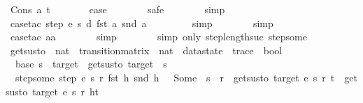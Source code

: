 \begin{isabellebody}
\ {\isacharparenleft}Cons\ a\ t{\isacharparenright}\isanewline
\ \ \ \ \isamarkupfalse%
\ \isamarkupfalse%
\ {\isacharquery}case\isanewline
\ \ \ \ \ \ \isamarkupfalse%
\ safe\isanewline
\ \ \ \ \ \ \isamarkupfalse%
\ simp\isanewline
\ \ \ \ \ \ \isamarkupfalse%
\ {\isacharparenleft}case{\isacharunderscore}tac\ {\isachardoublequoteopen}step\ e\ s\ d\ {\isacharparenleft}fst\ a{\isacharparenright}\ {\isacharparenleft}snd\ a{\isacharparenright}{\isachardoublequoteclose}{\isacharparenright}\isanewline
\ \ \ \ \ \ \ \isamarkupfalse%
\ simp\isanewline
\ \ \ \ \ \ \isamarkupfalse%
\ simp\isanewline
\ \ \ \ \ \ \isamarkupfalse%
\ {\isacharparenleft}case{\isacharunderscore}tac\ aa{\isacharparenright}\isanewline
\ \ \ \ \ \ \isamarkupfalse%
\ simp\isanewline
\ \ \ \ \ \ \isamarkupfalse%
\ {\isacharparenleft}simp\ only{\isacharcolon}\ step{\isacharunderscore}length{\isacharunderscore}suc\ step{\isacharunderscore}some{\isacharparenright}\isanewline
\ \ \isamarkupfalse%
%
\endisatagproof
{\isafoldproof}%
%
\isadelimproof
\isanewline
%
\endisadelimproof
\isanewline
{}\isamarkupfalse%
\ gets{\isacharunderscore}us{\isacharunderscore}to\ {\isacharcolon}{\isacharcolon}\ {\isachardoublequoteopen}nat\ {\isasymRightarrow}\ transition{\isacharunderscore}matrix\ {\isasymRightarrow}\ nat\ {\isasymRightarrow}\ datastate\ {\isasymRightarrow}\ trace\ {\isasymRightarrow}\ bool{\isachardoublequoteclose}\ \isanewline
\ \ base{\isacharcolon}\ {\isachardoublequoteopen}s\ {\isacharequal}\ target\ {\isasymLongrightarrow}\ gets{\isacharunderscore}us{\isacharunderscore}to\ target\ {\isacharunderscore}\ s\ {\isacharunderscore}\ {\isacharbrackleft}{\isacharbrackright}{\isachardoublequoteclose}\ {\isacharbar}\isanewline
\ \ step{\isacharunderscore}some{\isacharcolon}\ {\isachardoublequoteopen}step\ e\ s\ r\ {\isacharparenleft}fst\ h{\isacharparenright}\ {\isacharparenleft}snd\ h{\isacharparenright}\ {\isacharequal}\ \ Some\ {\isacharparenleft}{\isacharunderscore}{\isacharcomma}\ s{\isacharprime}{\isacharcomma}\ {\isacharunderscore}{\isacharcomma}\ r{\isacharprime}{\isacharparenright}\ {\isasymLongrightarrow}\ gets{\isacharunderscore}us{\isacharunderscore}to\ target\ e\ s{\isacharprime}\ r{\isacharprime}\ t\ {\isasymLongrightarrow}\ gets{\isacharunderscore}us{\isacharunderscore}to\ target\ e\ s\ r\ {\isacharparenleft}h{\isacharhash}t{\isacharparenright}{\isachardoublequoteclose}\ {\isacharbar}\isanewline

\end{isabellebody}

